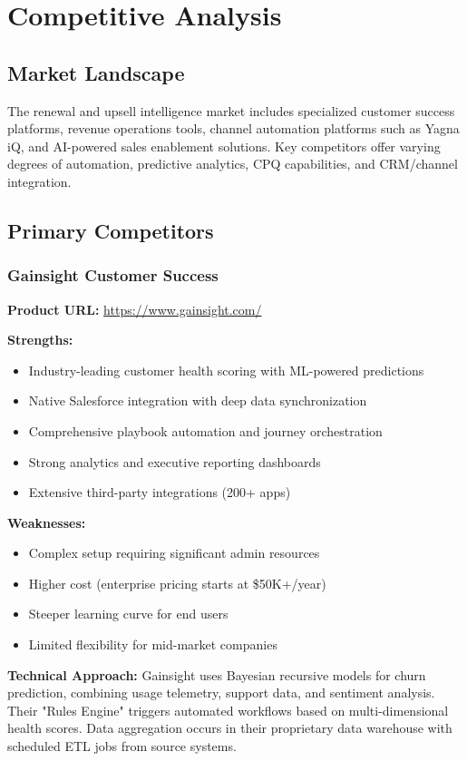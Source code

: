 \documentclass[12pt,a4paper]{article}
\begin{document}
\section{Competitive Analysis}

\subsection{Market Landscape}
The renewal and upsell intelligence market includes specialized customer success platforms, revenue operations tools, channel automation platforms such as Yagna iQ, and AI-powered sales enablement solutions. Key competitors offer varying degrees of automation, predictive analytics, CPQ capabilities, and CRM/channel integration.

\subsection{Primary Competitors}

\subsubsection{Gainsight Customer Success}
\textbf{Product URL:} \url{https://www.gainsight.com/}

\textbf{Strengths:}
\begin{itemize}
    \item Industry-leading customer health scoring with ML-powered predictions
    \item Native Salesforce integration with deep data synchronization
    \item Comprehensive playbook automation and journey orchestration
    \item Strong analytics and executive reporting dashboards
    \item Extensive third-party integrations (200+ apps)
\end{itemize}

\textbf{Weaknesses:}
\begin{itemize}
    \item Complex setup requiring significant admin resources
    \item Higher cost (enterprise pricing starts at \$50K+/year)
    \item Steeper learning curve for end users
    \item Limited flexibility for mid-market companies
\end{itemize}

\textbf{Technical Approach:} Gainsight uses Bayesian recursive models for churn prediction, combining usage telemetry, support data, and sentiment analysis. Their "Rules Engine" triggers automated workflows based on multi-dimensional health scores. Data aggregation occurs in their proprietary data warehouse with scheduled ETL jobs from source systems.
\end{document}
